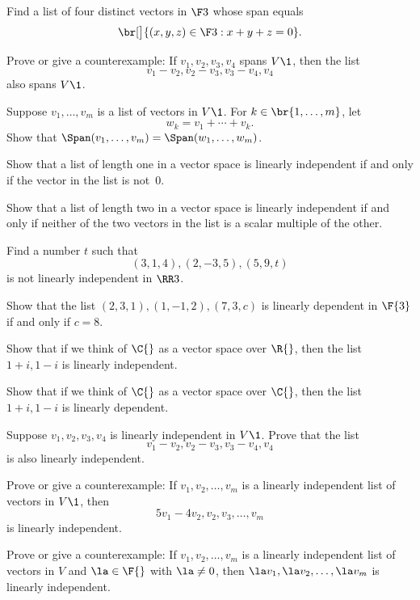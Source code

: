 
\exercise
Find a list of four distinct vectors in $\F3$ whose span equals
\[
\br[\big]{(x, y,z) \in \F3: x+y+z = 0}.
\]
\exercisedisplayend


\exercise
Prove or give a counterexample: If $v_1, v_2, v_3, v_4$ spans $V\1$, then the list
\[
v_1 - v_2, v_2 - v_3, v_3 - v_4, v_4
\]
also spans $V\1$.


\exercise
Suppose $v_1, \ldots, v_m$ is a list of vectors in $V\1$. For $k \in \br{1, \ldots, m}$, let\label{2span}
\[
w_k = v_1 + \cdots + v_k.
\]
Show that $\Span(v_1, \ldots, v_m) = \Span(w_1, \ldots, w_m)$.


\exercise
\begin{SUBtheorem}
\item
Show that a list of length one in a vector space is linearly independent if and only if the vector in the list is not~$0$.
\item
Show that a list of length two in a vector space is linearly independent if and only if neither of the two vectors in the list is a scalar multiple of the other.
\end{SUBtheorem}


\exercise
Find a number $t$ such that
\[
(3,1, 4), (2, -3, 5), (5, 9, t)
\]
is not linearly independent in $\RR3$.


\exercise
Show that the list $(2, 3, 1), (1, -1, 2), (7, 3, c)$ is linearly dependent in $\F{3}$ if and only if $c = 8$.


\exercise
\begin{SUBtheorem}
\item
Show that if we think of $\C{}$ as a vector space over $\R{}$, then the list \mbox{$1 + i, 1 - i$} is linearly independent.
\item
Show that if we think of $\C{}$ as a vector space over $\C{}$, then the list \mbox{$1 + i, 1 - i$} is linearly dependent.
\end{SUBtheorem}


\exercise
Suppose $v_1, v_2, v_3, v_4$ is linearly independent in $V\1$. Prove that the
list
\[
v_1 - v_2, v_2 - v_3, v_3 - v_4, v_4
\]
is also linearly independent.


\exercise
Prove or give a counterexample: If $v_1, v_2, \dots, v_m$ is a linearly independent list of vectors in $V\1$, then
\[
5v_1 - 4v_2, v_2, v_3, \dots, v_m
\]
is linearly independent.


\exercise
Prove or give a counterexample: If $v_1, v_2, \dots, v_m$ is a linearly independent list of vectors in $V$ and $\la \in \F{}$ with $\la \ne 0$, then $\la v_1, \la v_2, \dots,\la v_m$ is linearly independent.


